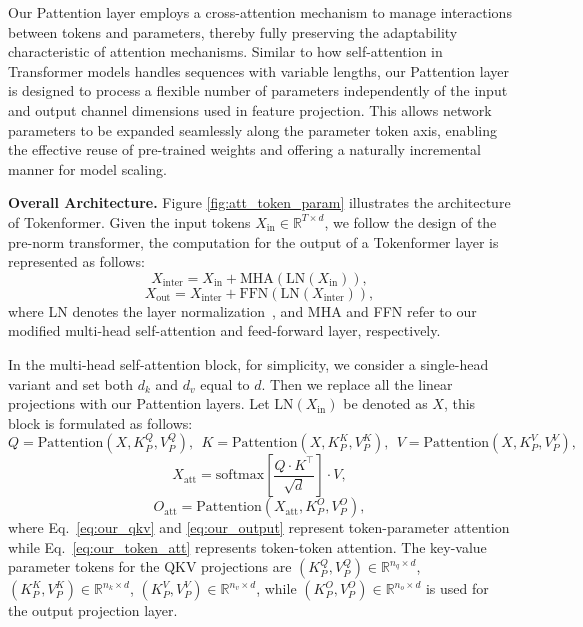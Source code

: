 \documentclass{article} %
\newcommand{\ourmethod}{Tokenformer\xspace}
\begin{document}
Our Pattention layer employs a cross-attention mechanism to manage interactions between tokens and parameters, thereby fully preserving the adaptability characteristic of attention mechanisms. Similar to how self-attention in Transformer models handles sequences with variable lengths, our Pattention layer is designed to process a flexible number of parameters independently of the input and output channel dimensions used in feature projection. This allows network parameters to be expanded seamlessly along the parameter token axis, enabling the effective reuse of pre-trained weights and offering a naturally incremental manner for model scaling.

\textbf{Overall Architecture.}
Figure \ref{fig:att_token_param} illustrates the architecture of {\ourmethod}. Given the input tokens $X_{\text{in}} \in \mathbb{R}^{T \times d}$, we follow the design of the pre-norm transformer, the computation for the output of a \ourmethod layer is
represented as follows:
\begin{equation}
    X_{\text{inter}} = X_{\text{in}} + \text{MHA}(\text{LN}(X_{\text{in}})),
\end{equation}
\begin{equation}
    X_{\text{out}} = X_{\text{inter}} + \text{FFN}(\text{LN}(X_{\text{inter}})),
\end{equation}
where LN denotes the layer normalization~\citep{ba2016layer,zhang2019root}, and MHA and FFN refer to our modified multi-head self-attention and feed-forward layer, respectively.

In the multi-head self-attention block, for simplicity, we consider a single-head variant and set both $d_k$ and $d_v$ equal to $d$. Then we replace all the linear projections with our Pattention layers. Let $\text{LN}(X_{\text{in}})$ be denoted as $X$, this block is formulated as follows:
\begin{equation}
    Q = \text{Pattention}(X, K_P^{Q}, V_P^{Q}), ~~K = \text{Pattention}(X, K_P^{K}, V_P^{K}), ~~V = \text{Pattention}(X, K_P^{V}, V_P^{V}),
    \label{eq:our_qkv}
\end{equation}
\begin{equation}
    X_{\text{att}} = \text{softmax}\left[\frac{Q \cdot K^{\top}}{\sqrt{d}}\right]\cdot V,
    \label{eq:our_token_att}
\end{equation}
\begin{equation}
    O_{\text{att}} = \text{Pattention}\left(X_{\text{att}}, K_P^{O}, V_P^{O}\right),
    \label{eq:our_output}
\end{equation}
where Eq.~\ref{eq:our_qkv} and \ref{eq:our_output} represent token-parameter attention while Eq.~\ref{eq:our_token_att} represents token-token attention. The key-value parameter tokens for the QKV projections are $(K_P^{Q}, V_P^{Q}) \in \mathbb{R}^{n_q \times d}$, $(K_P^{K}, V_P^{K}) \in \mathbb{R}^{n_k \times d}$, $(K_P^{V}, V_P^{V}) \in \mathbb{R}^{n_v \times d}$, while $(K_P^{O}, V_P^{O}) \in \mathbb{R}^{n_o \times d}$ is used for the output projection layer.
\end{document}
